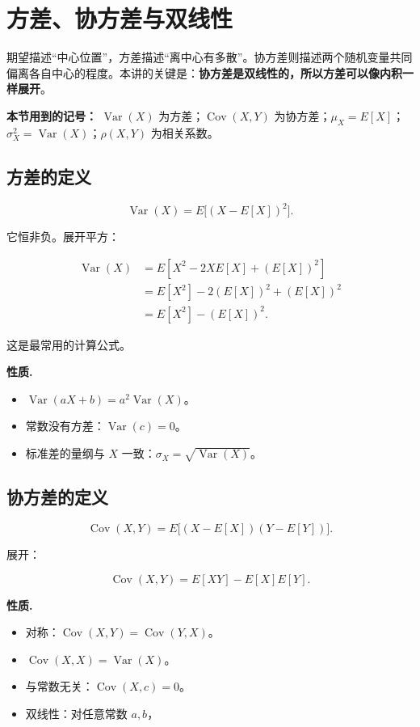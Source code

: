 \section{方差、协方差与双线性}


期望描述“中心位置”，方差描述“离中心有多散”。协方差则描述两个随机变量共同偏离各自中心的程度。本讲的关键是：\textbf{协方差是双线性的，所以方差可以像内积一样展开}。

\textbf{本节用到的记号：} $\operatorname{Var}(X)$ 为方差；$\operatorname{Cov}(X,Y)$ 为协方差；$\mu_X=E[X]$；$\sigma_X^2=\operatorname{Var}(X)$；$\rho(X,Y)$ 为相关系数。

\subsection{方差的定义}


\[
\operatorname{Var}(X)=E\bigl[(X-E[X])^2\bigr].
\]

它恒非负。展开平方：

\[
\begin{aligned}
\operatorname{Var}(X)
&=E[X^2-2X E[X]+(E[X])^2]\\
&=E[X^2]-2(E[X])^2+(E[X])^2\\
&=E[X^2]-(E[X])^2.
\end{aligned}
\]

这是最常用的计算公式。

\textbf{性质.}

\begin{itemize}
\item $\operatorname{Var}(aX+b)=a^2\operatorname{Var}(X)$。
\item 常数没有方差：$\operatorname{Var}(c)=0$。
\item 标准差的量纲与 $X$ 一致：$\sigma_X=\sqrt{\operatorname{Var}(X)}$。
\end{itemize}


\subsection{协方差的定义}


\[
\operatorname{Cov}(X,Y)
=E\bigl[(X-E[X])(Y-E[Y])\bigr].
\]

展开：

\[
\operatorname{Cov}(X,Y)=E[XY]-E[X]E[Y].
\]

\textbf{性质.}

\begin{itemize}
\item 对称：$\operatorname{Cov}(X,Y)=\operatorname{Cov}(Y,X)$。
\item $\operatorname{Cov}(X,X)=\operatorname{Var}(X)$。
\item 与常数无关：$\operatorname{Cov}(X,c)=0$。
\item 双线性：对任意常数 $a,b$，
\end{itemize}


